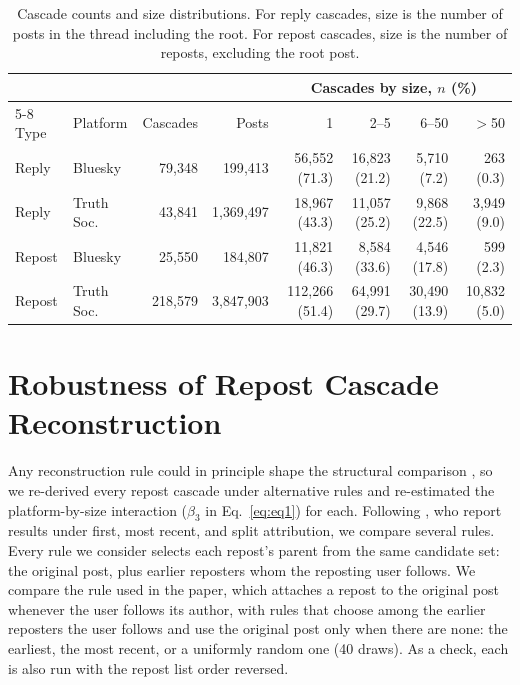 \documentclass[letterpaper]{article} %
\newcommand{\rev}[1]{{\color{blue}#1}}
\begin{document}
\begin{table}[!t]
\centering
\small
\rev{
\begin{tabular}{llrrrrrr}
\toprule
 & & & & \multicolumn{4}{c}{\rev{Cascades by size, $n$ (\%)}} \\
\cmidrule(lr){5-8}
Type & Platform & Cascades & Posts & 1 & 2--5 & 6--50 & $>$50 \\
\midrule
Reply & Bluesky & 79{,}348 & 199{,}413 & \rev{56{,}552 (71.3)} & \rev{16{,}823 (21.2)} & \rev{5{,}710 (7.2)} & \rev{263 (0.3)} \\
Reply & Truth Soc. & 43{,}841 & 1{,}369{,}497 & \rev{18{,}967 (43.3)} & \rev{11{,}057 (25.2)} & \rev{9{,}868 (22.5)} & \rev{3{,}949 (9.0)} \\
Repost & Bluesky & 25{,}550 & 184{,}807 & \rev{11{,}821 (46.3)} & \rev{8{,}584 (33.6)} & \rev{4{,}546 (17.8)} & \rev{599 (2.3)} \\
Repost & Truth Soc. & 218{,}579 & 3{,}847{,}903 & \rev{112{,}266 (51.4)} & \rev{64{,}991 (29.7)} & \rev{30{,}490 (13.9)} & \rev{10{,}832 (5.0)} \\
\bottomrule
\end{tabular}
}
\caption{\rev{Cascade counts and size distributions. For reply cascades, size is the number of posts in the thread including the root. For repost cascades, size is the number of reposts, excluding the root post.}}
\label{tab:descriptives}
\end{table}

\section{\rev{Robustness of Repost Cascade Reconstruction}}

\rev{Any reconstruction rule could in principle shape the structural comparison \citep{deverna_cascade_2024}, so we re-derived every repost cascade under alternative rules and re-estimated the platform-by-size interaction ($\beta_3$ in Eq.~\ref{eq:eq1}) for each. Following \citet{bakshy_everyones_2011}, who report results under first, most recent, and split attribution, we compare several rules. Every rule we consider selects each repost's parent from the same candidate set: the original post, plus earlier reposters whom the reposting user follows. We compare the rule used in the paper, which attaches a repost to the original post whenever the user follows its author, with rules that choose among the earlier reposters the user follows and use the original post only when there are none: the earliest, the most recent, or a uniformly random one (40 draws). As a check, each is also run with the repost list order reversed.}
\end{document}
